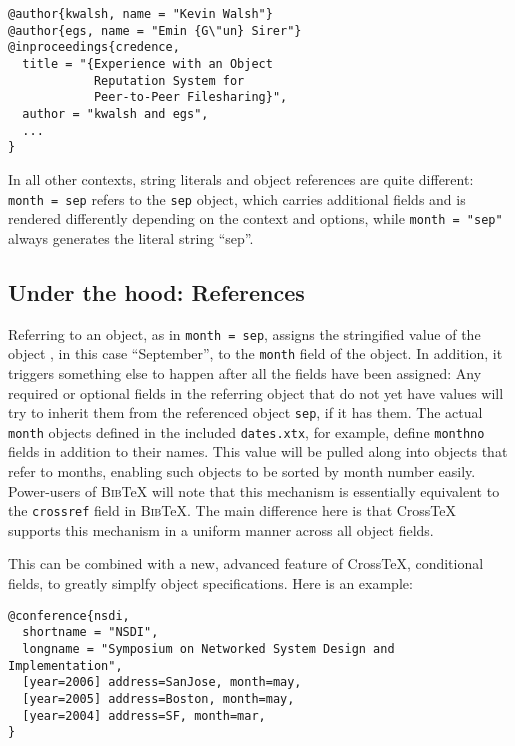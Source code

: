 \documentclass{article}
\newcommand{\XTeX}{Cross\TeX}
\newcommand{\BibTeX}{\textsc{Bib}\TeX}
\begin{document}
\begin{small}\begin{verbatim}
@author{kwalsh, name = "Kevin Walsh"}
@author{egs, name = "Emin {G\"un} Sirer"}
@inproceedings{credence,
  title = "{Experience with an Object
            Reputation System for 
            Peer-to-Peer Filesharing}",
  author = "kwalsh and egs",
  ...
}
\end{verbatim}\end{small}

In all other contexts, string literals and object references are quite different: \texttt{month = sep} refers to the \texttt{sep} object, which carries additional fields and is rendered differently depending on the context and options, while \texttt{month = "sep"} always generates the literal string ``sep''.

\subsection{Under the hood: References}

Referring to an object, as in \texttt{month = sep}, assigns the stringified value of the object \te{}, in this case ``September'', to the \texttt{month} field of the object. In addition, it triggers something else to happen after all the fields have been assigned: Any required or optional fields in the referring object that do not yet have values will try to inherit them from the referenced object \texttt{sep}, if it has them. The actual \texttt{month} objects defined in the included \texttt{dates.xtx}, for example, define \texttt{monthno} fields in addition to their names. This value will be pulled along into objects that refer to months, enabling such objects to be sorted by month number easily. Power-users of \BibTeX{} will note that this mechanism is essentially equivalent to the \texttt{crossref} field in \BibTeX{}. The main difference here is that \XTeX{} supports this mechanism in a uniform manner across all object fields.

This can be combined with a new, advanced feature of \XTeX{}, conditional fields, to greatly simplfy object specifications. Here is an example:

\begin{small}\begin{verbatim}
@conference{nsdi,
  shortname = "NSDI",
  longname = "Symposium on Networked System Design and Implementation", 
  [year=2006] address=SanJose, month=may,
  [year=2005] address=Boston, month=may,
  [year=2004] address=SF, month=mar,
}
\end{verbatim}\end{small}
\end{document}
